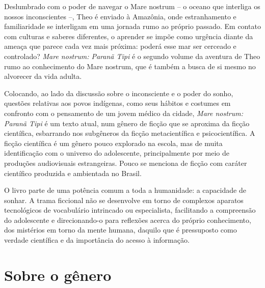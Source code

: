 Deslumbrado com o poder de navegar o Mare nostrum -- o oceano que interliga os nossos inconscientes --, Theo é enviado à Amazônia, onde estranhamento e familiaridade se interligam em uma jornada rumo ao próprio passado. Em contato com culturas e saberes diferentes, o aprender se impõe como urgência diante da ameaça que parece cada vez mais próxima: poderá esse mar ser cerceado e controlado? \textit{Mare nostrum: Paranã Tipi} é o segundo volume da aventura de Theo rumo ao conhecimento do Mare nostrum, que é também a busca de si mesmo no alvorecer da vida adulta.

Colocando, ao lado da discussão sobre o inconsciente e o poder do sonho, questões relativas aos povos indígenas, como seus hábitos e costumes em confronto com o pensamento de um jovem médico da cidade, \emph{Mare nostrum: Paranã Tipi} é um texto atual, num gênero de ficção que se aproxima da ficção científica, esbarrando nos subgêneros da ficção metacientífica e psicocientífica. A ficção científica é um gênero pouco explorado na escola, mas de muita identificação com o universo do adolescente, principalmente por meio de produções audiovisuais estrangeiras. Pouco se menciona de ficção com caráter científico produzida e ambientada no Brasil.

O livro parte de uma potência comum a toda a humanidade: a capacidade de sonhar. A trama ficcional não se desenvolve em torno de complexos aparatos tecnológicos de vocabulário intrincado ou especialista, facilitando a compreensão do adolescente e direcionando-o para reflexões acerca do próprio conhecimento, dos mistérios em torno da mente humana, daquilo que é pressuposto como verdade científica e da importância do acesso à informação. 



\section{Sobre o gênero}

